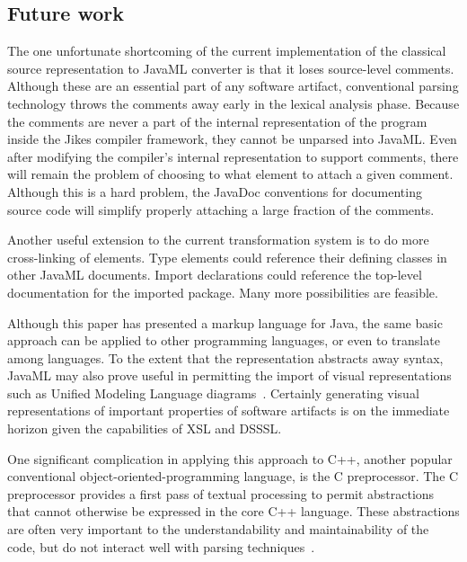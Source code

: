 \documentclass{article}
\begin{document}
\begin{multicols}{2}

\section{Future work}
\label{sec-future}

The one unfortunate shortcoming of the current implementation of the
classical source representation to JavaML converter is that it loses
source-level comments.  Although these are an essential part of any
software artifact, conventional parsing technology throws the comments
away early in the lexical analysis phase.  Because the comments are
never a part of the internal representation of the program inside the
Jikes compiler framework, they cannot be unparsed into JavaML.  Even
after modifying the compiler's internal representation to support
comments, there will remain the problem of choosing to what element to
attach a given comment.  Although this is a hard problem, the JavaDoc
conventions for documenting source code will simplify properly attaching
a large fraction of the comments.

Another useful extension to the current transformation system is to do
more cross-linking of elements.  Type elements could reference their
defining classes in other JavaML documents.  Import declarations could
reference the top-level documentation for the imported package.  Many
more possibilities are feasible.

Although this paper has presented a markup language for Java, the same
basic approach can be applied to other programming languages, or even to
translate among languages.  To the extent that the representation
abstracts away syntax, JavaML may also prove useful in permitting the
import of visual representations such as Unified Modeling Language
diagrams~\cite{UMLNutshell,XMI}.  Certainly generating visual
representations of important properties of software artifacts is on the
immediate horizon given the capabilities of XSL and DSSSL.

One significant complication in applying this approach to C++, another
popular conventional object-oriented-programming language, is the C
preprocessor.  The C preprocessor provides a first pass of textual
processing to permit abstractions that cannot otherwise be expressed in
the core C++ language.  These abstractions are often very important to
the understandability and maintainability of the code, but do not
interact well with parsing techniques~\cite{ErnstBadrosNotkin00,Badros00-spe}.


\end{multicols}
\end{document}
